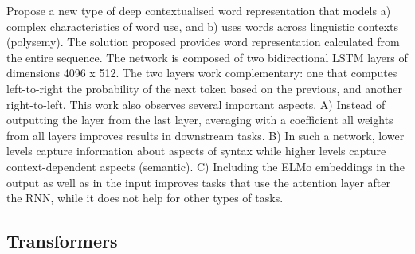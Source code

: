 \cite{peters2018deep} Propose a new type of deep contextualised word representation that models a) complex characteristics of word use, and b) uses words across linguistic contexts (polysemy). 
The solution proposed provides word representation calculated from the entire sequence. The network is composed of two bidirectional LSTM layers of dimensions 4096 x 512. 
The two layers work complementary: one that computes left-to-right the probability of the next token based on the previous, and another right-to-left.
This work also observes several important aspects. A) Instead of outputting the layer from the last layer, averaging with a coefficient all weights from all layers improves results in downstream tasks. B) In such a network, lower levels capture information about aspects of syntax while higher levels capture context-dependent aspects (semantic). C) Including the ELMo embeddings in the output as well as in the input improves tasks that use the attention layer after the RNN, while it does not help for other types of tasks.  


\subsection{Transformers}

